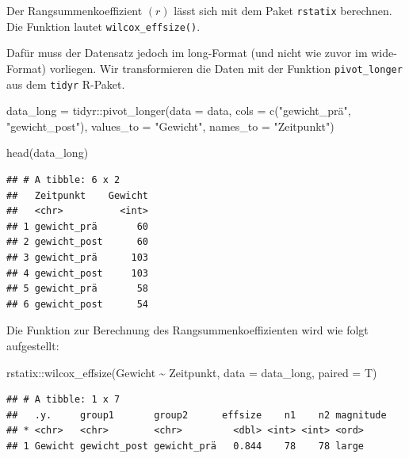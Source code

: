 \documentclass[
]{book}
\newenvironment{Shaded}{\begin{snugshade}}{\end{snugshade}}
\newcommand{\AttributeTok}[1]{\textcolor[rgb]{0.77,0.63,0.00}{#1}}
\newcommand{\FunctionTok}[1]{\textcolor[rgb]{0.00,0.00,0.00}{#1}}
\newcommand{\NormalTok}[1]{#1}
\newcommand{\OtherTok}[1]{\textcolor[rgb]{0.56,0.35,0.01}{#1}}
\newcommand{\SpecialCharTok}[1]{\textcolor[rgb]{0.00,0.00,0.00}{#1}}
\newcommand{\StringTok}[1]{\textcolor[rgb]{0.31,0.60,0.02}{#1}}
\begin{document}
Der Rangsummenkoeffizient \((r)\) lässt sich mit dem Paket \texttt{rstatix} berechnen. Die Funktion lautet \texttt{wilcox\_effsize()}.

Dafür muss der Datensatz jedoch im long-Format (und nicht wie zuvor im wide-Format) vorliegen. Wir transformieren die Daten mit der Funktion \texttt{pivot\_longer} aus dem \texttt{tidyr} R-Paket.

\begin{Shaded}
\begin{Highlighting}[]
\NormalTok{data\_long }\OtherTok{=}\NormalTok{ tidyr}\SpecialCharTok{::}\FunctionTok{pivot\_longer}\NormalTok{(}\AttributeTok{data =}\NormalTok{ data, }
                                \AttributeTok{cols =} \FunctionTok{c}\NormalTok{(}\StringTok{"gewicht\_prä"}\NormalTok{, }\StringTok{"gewicht\_post"}\NormalTok{), }
                                \AttributeTok{values\_to =} \StringTok{"Gewicht"}\NormalTok{,}
                                \AttributeTok{names\_to =} \StringTok{"Zeitpunkt"}\NormalTok{)}

\FunctionTok{head}\NormalTok{(data\_long)}
\end{Highlighting}
\end{Shaded}

\begin{verbatim}
## # A tibble: 6 x 2
##   Zeitpunkt    Gewicht
##   <chr>          <int>
## 1 gewicht_prä       60
## 2 gewicht_post      60
## 3 gewicht_prä      103
## 4 gewicht_post     103
## 5 gewicht_prä       58
## 6 gewicht_post      54
\end{verbatim}

Die Funktion zur Berechnung des Rangsummenkoeffizienten wird wie folgt aufgestellt:

\begin{Shaded}
\begin{Highlighting}[]
\NormalTok{rstatix}\SpecialCharTok{::}\FunctionTok{wilcox\_effsize}\NormalTok{(Gewicht }\SpecialCharTok{\textasciitilde{}}\NormalTok{ Zeitpunkt, }\AttributeTok{data =}\NormalTok{ data\_long, }\AttributeTok{paired =}\NormalTok{ T)}
\end{Highlighting}
\end{Shaded}

\begin{verbatim}
## # A tibble: 1 x 7
##   .y.     group1       group2      effsize    n1    n2 magnitude
## * <chr>   <chr>        <chr>         <dbl> <int> <int> <ord>    
## 1 Gewicht gewicht_post gewicht_prä   0.844    78    78 large
\end{verbatim}
\end{document}
